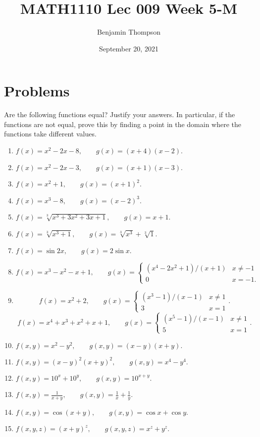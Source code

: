 \documentclass[12pt,a4paper]{article}
\title{MATH1110 Lec 009 Week 5-M}
\author{Benjamin Thompson}
\date{September 20, 2021}
\begin{document}
\section*{Problems}
Are the following functions equal? Justify your answers. In particular, if the functions are not equal, prove this by finding a point in the domain where the functions take different values.

\begin{enumerate}
    \item $f(x) = x^2 - 2x - 8, \qquad g(x) = (x+4)(x-2)$.
    \item $f(x) = x^2 - 2x - 3, \qquad g(x) =  (x+1)(x-3)$.
    \item $f(x) = x^2 + 1, \qquad g(x) = (x + 1)^2$.
    \item $f(x) = x^3 - 8, \qquad g(x) =  (x-2)^3$.
    \item $f(x) = \sqrt[3]{x^3 + 3x^2 + 3x + 1}, \qquad g(x) = x + 1$.
    \item $f(x) = \sqrt[3]{x^3 + 1}, \qquad g(x) = \sqrt[3]{x^3} + \sqrt[3]{1}$.
    \item $f(x) = \sin 2x, \qquad g(x) = 2\sin x$.
    \item
       \[ f(x) = x^3 - x^2 - x + 1, \qquad g(x) = \begin{cases} 
          (x^4 - 2x^2 + 1)/(x+1) & x \ne -1 \\
          0 & x = -1.
       \end{cases}
    \]
    \item
       \[ f(x) = x^2 + 2, \qquad g(x) = \begin{cases} 
          (x^3 - 1)/(x-1) & x \ne 1 \\
          3 & x = 1
       \end{cases}.
    \]
       \[ f(x) = x^4 + x^3 + x^2 + x + 1, \qquad g(x) = \begin{cases} 
          (x^5 - 1)/(x-1) & x \ne 1 \\
          5 & x = 1
       \end{cases}.
    \]
    \item $f(x,y) = x^2 - y^2, \qquad g(x,y) = (x-y)(x+y).$
    \item $f(x,y) = (x-y)^2(x+y)^2, \qquad g(x,y) = x^4 - y^4.$
    \item $f(x,y) = 10^x + 10^y, \qquad g(x,y) = 10^{x + y}$.
    \item $f(x,y) = \frac{1}{x+y}, \qquad g(x,y) = \frac{1}{x} + \frac{1}{y}.$
    \item $f(x,y) = \cos(x+y), \qquad g(x,y) = \cos x + \cos y.$
    \item $f(x,y,z) = (x + y)^z, \qquad g(x,y,z) = x^z + y^z.$
\end{enumerate}
\end{document}
